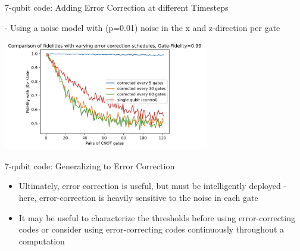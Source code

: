 \documentclass{beamer}
\begin{document}
\begin{frame}{7-qubit code: Adding Error Correction at different Timesteps}
  
  - Using a noise model with (p=0.01) noise in the x and z-direction per gate 
  \begin{center}
    \includegraphics[width=9cm]{7-schedule-comparison-2.png}
  \end{center}
\end{frame}

\begin{frame}{7-qubit code: Generalizing to Error Correction}
    \begin{itemize}
        \item Ultimately, error correction is useful, but must be intelligently deployed - here, error-correction is heavily sensitive to the noise in each gate
        \item It may be useful to characterize the thresholds before using error-correcting codes or consider using error-correcting codes continuously throughout a computation
    \end{itemize}
\end{frame}
\end{document}
